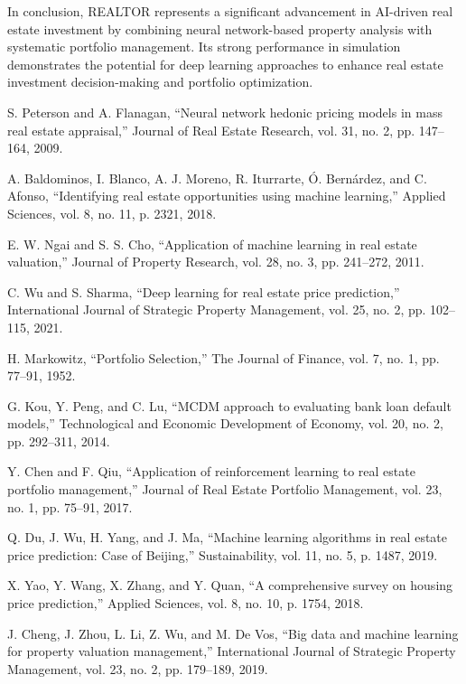 \documentclass[conference]{IEEEtran}
\begin{document}
In conclusion, REALTOR represents a significant advancement in AI-driven real estate investment by combining neural network-based property analysis with systematic portfolio management. Its strong performance in simulation demonstrates the potential for deep learning approaches to enhance real estate investment decision-making and portfolio optimization.

\begin{thebibliography}{00}

 S. Peterson and A. Flanagan, ``Neural network hedonic pricing models in mass real estate appraisal,'' Journal of Real Estate Research, vol. 31, no. 2, pp. 147--164, 2009.

 A. Baldominos, I. Blanco, A. J. Moreno, R. Iturrarte, Ó. Bernárdez, and C. Afonso, ``Identifying real estate opportunities using machine learning,'' Applied Sciences, vol. 8, no. 11, p. 2321, 2018.

 E. W. Ngai and S. S. Cho, ``Application of machine learning in real estate valuation,'' Journal of Property Research, vol. 28, no. 3, pp. 241--272, 2011.

 C. Wu and S. Sharma, ``Deep learning for real estate price prediction,'' International Journal of Strategic Property Management, vol. 25, no. 2, pp. 102--115, 2021.

 H. Markowitz, ``Portfolio Selection,'' The Journal of Finance, vol. 7, no. 1, pp. 77--91, 1952.

 G. Kou, Y. Peng, and C. Lu, ``MCDM approach to evaluating bank loan default models,'' Technological and Economic Development of Economy, vol. 20, no. 2, pp. 292--311, 2014.

 Y. Chen and F. Qiu, ``Application of reinforcement learning to real estate portfolio management,'' Journal of Real Estate Portfolio Management, vol. 23, no. 1, pp. 75--91, 2017.

 Q. Du, J. Wu, H. Yang, and J. Ma, ``Machine learning algorithms in real estate price prediction: Case of Beijing,'' Sustainability, vol. 11, no. 5, p. 1487, 2019.

 X. Yao, Y. Wang, X. Zhang, and Y. Quan, ``A comprehensive survey on housing price prediction,'' Applied Sciences, vol. 8, no. 10, p. 1754, 2018.

 J. Cheng, J. Zhou, L. Li, Z. Wu, and M. De Vos, ``Big data and machine learning for property valuation management,'' International Journal of Strategic Property Management, vol. 23, no. 2, pp. 179--189, 2019.


\end{thebibliography}
\end{document}
